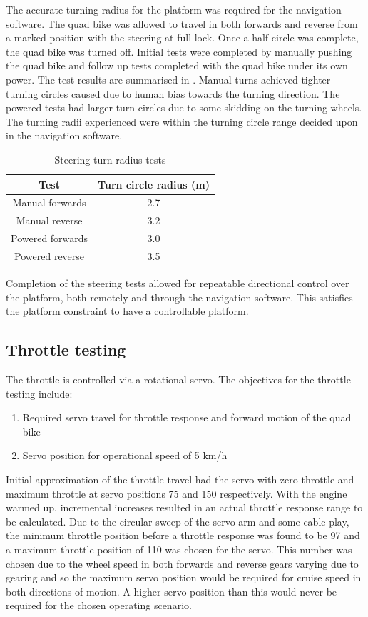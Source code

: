 \documentclass[main.tex]{subfiles}
\begin{document}
The accurate turning radius for the platform was required for the navigation software. The quad bike was allowed to travel in both forwards and reverse from a marked position with the steering at full lock. Once a half circle was complete, the quad bike was turned off. Initial tests were completed by manually pushing the quad bike and follow up tests completed with the quad bike under its own power. The test results are summarised in . Manual turns achieved tighter turning circles caused due to human bias towards the turning direction. The powered tests had larger turn circles due to some skidding on the turning wheels. The turning radii experienced were within the turning circle range decided upon in the navigation software.
\begin{table}[ht]
\centering
\caption{Steering turn radius tests}
\begin{tabular}{cc}
\toprule
Test & Turn circle radius (m) \\ \midrule
Manual forwards & 2.7 \\
Manual reverse & 3.2 \\
Powered forwards & 3.0 \\
Powered reverse & 3.5 \\ \bottomrule
\end{tabular}
\end{table}
Completion of the steering tests allowed for repeatable directional control over the platform, both remotely and through the navigation software. This satisfies the platform constraint to have a controllable platform.  

\subsection{Throttle testing}
The throttle is controlled via a rotational servo. The objectives for the throttle testing include:
\begin{enumerate}
\item Required servo travel for throttle response and forward motion of the quad bike
\item Servo position for operational speed of 5 km/h
\end{enumerate}
Initial approximation of the throttle travel had the servo with zero throttle and maximum throttle at servo positions 75 and 150 respectively. With the engine warmed up, incremental increases resulted in an actual throttle response range to be calculated. Due to the circular sweep of the servo arm and some cable play, the minimum throttle position before a throttle response was found to be 97 and a maximum throttle position of 110 was chosen for the servo. This number was chosen due to the wheel speed in both forwards and reverse gears varying due to gearing and so the maximum servo position would be required for cruise speed in both directions of motion. A higher servo position than this would never be required for the chosen operating scenario.
\end{document}
